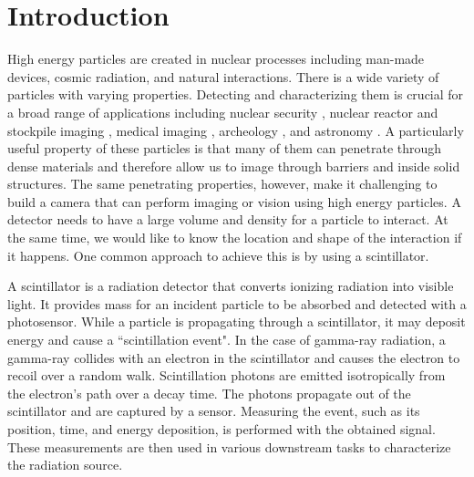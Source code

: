 \section{Introduction}


High energy particles are created in nuclear processes including man-made 
devices, cosmic radiation, and natural interactions. 
There is a wide variety of particles with varying properties. 
Detecting and characterizing them is crucial for a broad range of applications 
including nuclear security \cite{vetter2018gamma}, nuclear reactor and stockpile imaging \cite{beaumont2015high}, 
medical imaging \cite{gonzalez2021evolution}, 
archeology \cite{menichelli2007scintillating,ryzewski2013neutron}, 
and astronomy \cite{schonfelder1984imaging}. 
A particularly useful property of these particles is that many of them can 
penetrate through dense materials and therefore allow us to image through 
barriers and inside solid structures. 
The same penetrating properties, however, make it challenging to build a camera 
that can perform imaging or vision using high energy particles. 
A detector needs to have a large volume and density for a particle to interact. 
At the same time, we would like to know the location and shape of the interaction if it happens. 
One common approach to achieve this is by using a scintillator.

A scintillator is a radiation detector that converts ionizing radiation into 
visible light.
It provides mass for an incident particle to be absorbed and detected with a photosensor.
While a particle is propagating through a scintillator, it may deposit energy and 
cause a ``scintillation event". 
In the case of gamma-ray radiation, a gamma-ray collides with an electron in the 
scintillator and causes the electron to recoil over a random walk.
Scintillation photons are emitted isotropically from the electron's path over a 
decay time.
The photons propagate out of the scintillator and are captured by a sensor.
Measuring the event, such as its position, time, and energy deposition, is 
performed with the obtained signal.
These measurements are then used in various downstream tasks to characterize 
the radiation source.

